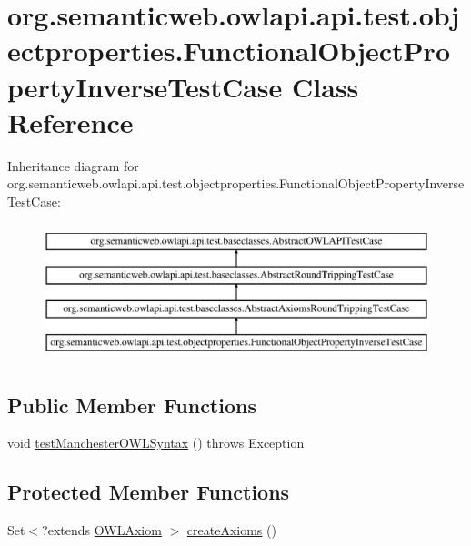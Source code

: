 \hypertarget{classorg_1_1semanticweb_1_1owlapi_1_1api_1_1test_1_1objectproperties_1_1_functional_object_property_inverse_test_case}{\section{org.\-semanticweb.\-owlapi.\-api.\-test.\-objectproperties.\-Functional\-Object\-Property\-Inverse\-Test\-Case Class Reference}
\label{classorg_1_1semanticweb_1_1owlapi_1_1api_1_1test_1_1objectproperties_1_1_functional_object_property_inverse_test_case}
}
Inheritance diagram for org.\-semanticweb.\-owlapi.\-api.\-test.\-objectproperties.\-Functional\-Object\-Property\-Inverse\-Test\-Case\-:\begin{figure}[H]
\begin{center}
\leavevmode
\includegraphics[height=4.000000cm]{classorg_1_1semanticweb_1_1owlapi_1_1api_1_1test_1_1objectproperties_1_1_functional_object_property_inverse_test_case}
\end{center}
\end{figure}
\subsection*{Public Member Functions}
\begin{DoxyCompactItemize}
\item 
void \hyperlink{classorg_1_1semanticweb_1_1owlapi_1_1api_1_1test_1_1objectproperties_1_1_functional_object_property_inverse_test_case_acc6e5996bcc1ae329aaeee8224a85fb1}{test\-Manchester\-O\-W\-L\-Syntax} ()  throws Exception 
\end{DoxyCompactItemize}
\subsection*{Protected Member Functions}
\begin{DoxyCompactItemize}
\item 
Set$<$?extends \hyperlink{interfaceorg_1_1semanticweb_1_1owlapi_1_1model_1_1_o_w_l_axiom}{O\-W\-L\-Axiom} $>$ \hyperlink{classorg_1_1semanticweb_1_1owlapi_1_1api_1_1test_1_1objectproperties_1_1_functional_object_property_inverse_test_case_aed43c32b6127950d43934817c94f6c85}{create\-Axioms} ()
\end{DoxyCompactItemize}


